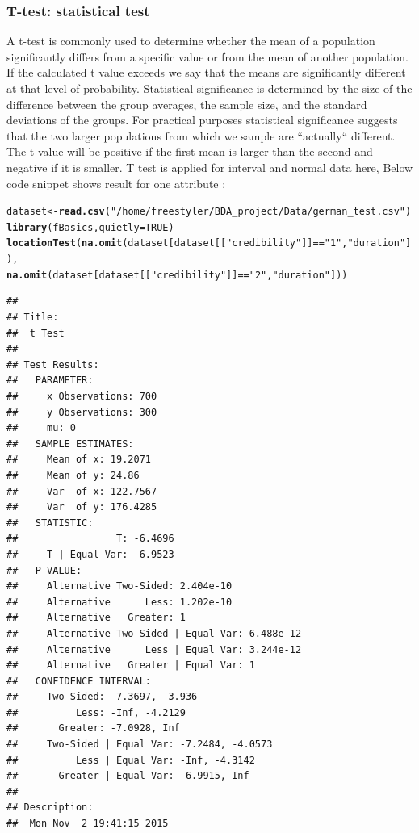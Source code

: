 \documentclass{article}\usepackage[]{graphicx}\usepackage[]{color}
\makeatletter
\newcommand{\hlnum}[1]{\textcolor[rgb]{0.686,0.059,0.569}{#1}}%
\newcommand{\hlstr}[1]{\textcolor[rgb]{0.192,0.494,0.8}{#1}}%
\newcommand{\hlopt}[1]{\textcolor[rgb]{0,0,0}{#1}}%
\newcommand{\hlstd}[1]{\textcolor[rgb]{0.345,0.345,0.345}{#1}}%
\newcommand{\hlkwb}[1]{\textcolor[rgb]{0.69,0.353,0.396}{#1}}%
\newcommand{\hlkwc}[1]{\textcolor[rgb]{0.333,0.667,0.333}{#1}}%
\newcommand{\hlkwd}[1]{\textcolor[rgb]{0.737,0.353,0.396}{\textbf{#1}}}%
\newenvironment{kframe}{%
 \def\at@end@of@kframe{}%
 \ifinner\ifhmode%
  \def\at@end@of@kframe{\end{minipage}}%
  \begin{minipage}{\columnwidth}%
 \fi\fi%
 \def\FrameCommand##1{\hskip\@totalleftmargin \hskip-\fboxsep
 \colorbox{shadecolor}{##1}\hskip-\fboxsep
     \hskip-\linewidth \hskip-\@totalleftmargin \hskip\columnwidth}%
 \MakeFramed {\advance\hsize-\width
   \@totalleftmargin\z@ \linewidth\hsize
   \@setminipage}}%
 {\par\unskip\endMakeFramed%
 \at@end@of@kframe}
\newenvironment{knitrout}{}{} %
\makeatother
\begin{document}
\subsubsection{T-test: statistical test}A t-test is commonly used to determine whether the mean of a population significantly differs from a specific value or from the mean of another population.  If the calculated t value exceeds we say that the means are significantly different at that level of probability. Statistical significance is determined by the size of the difference between the group averages, the sample size, and the standard deviations of the groups. For practical purposes statistical significance suggests that the two larger populations from which we sample are ``actually`` different. The t-value will be positive if the first mean is larger than the second and negative if it is smaller. T test is applied for interval and normal data \cite{[3]} here, Below code snippet shows result for one attribute :
\begin{knitrout}
\color{fgcolor}\begin{kframe}
\begin{alltt}
\hlstd{dataset} \hlkwb{<-} \hlkwd{read.csv}\hlstd{(}\hlstr{"/home/freestyler/BDA_project/Data/german_test.csv"}\hlstd{)}
\hlkwd{library}\hlstd{(fBasics,} \hlkwc{quietly}\hlstd{=}\hlnum{TRUE}\hlstd{)}
\hlkwd{locationTest}\hlstd{(}\hlkwd{na.omit}\hlstd{(dataset[dataset[[}\hlstr{"credibility"}\hlstd{]]} \hlopt{==} \hlstr{"1"}\hlstd{,} \hlstr{"duration"}\hlstd{]),}
             \hlkwd{na.omit}\hlstd{(dataset[dataset[[}\hlstr{"credibility"}\hlstd{]]} \hlopt{==} \hlstr{"2"}\hlstd{,} \hlstr{"duration"}\hlstd{]))}
\end{alltt}
\begin{verbatim}
## 
## Title:
##  t Test
## 
## Test Results:
##   PARAMETER:
##     x Observations: 700
##     y Observations: 300
##     mu: 0
##   SAMPLE ESTIMATES:
##     Mean of x: 19.2071
##     Mean of y: 24.86
##     Var  of x: 122.7567
##     Var  of y: 176.4285
##   STATISTIC:
##                 T: -6.4696
##     T | Equal Var: -6.9523
##   P VALUE:
##     Alternative Two-Sided: 2.404e-10 
##     Alternative      Less: 1.202e-10 
##     Alternative   Greater: 1 
##     Alternative Two-Sided | Equal Var: 6.488e-12 
##     Alternative      Less | Equal Var: 3.244e-12 
##     Alternative   Greater | Equal Var: 1 
##   CONFIDENCE INTERVAL:
##     Two-Sided: -7.3697, -3.936
##          Less: -Inf, -4.2129
##       Greater: -7.0928, Inf
##     Two-Sided | Equal Var: -7.2484, -4.0573
##          Less | Equal Var: -Inf, -4.3142
##       Greater | Equal Var: -6.9915, Inf
## 
## Description:
##  Mon Nov  2 19:41:15 2015
\end{verbatim}
\end{kframe}
\end{knitrout}
\end{document}
